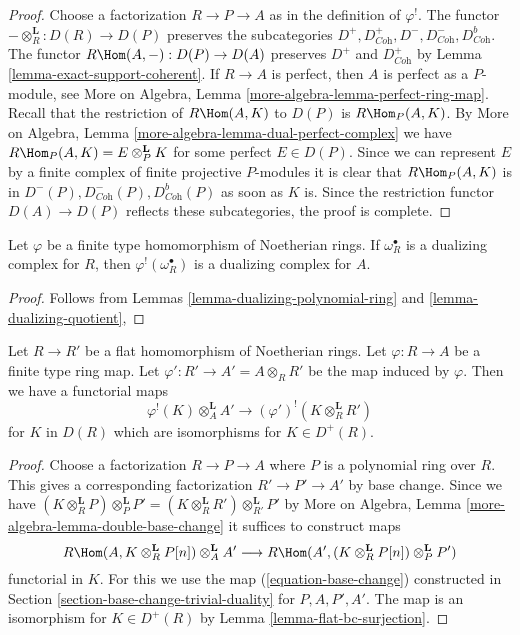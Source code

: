 \begin{proof}
Choose a factorization $R \to P \to A$ as in the definition of $\varphi^!$.
The functor $- \otimes_R^\mathbf{L} : D(R) \to D(P)$ preserves
the subcategories
$D^+, D^+_{\textit{Coh}}, D^-, D^-_{\textit{Coh}}, D^b_{\textit{Coh}}$.
The functor $R\Hom(A, -) : D(P) \to D(A)$
preserves $D^+$ and $D^+_{\textit{Coh}}$ by
Lemma \ref{lemma-exact-support-coherent}.
If $R \to A$ is perfect, then $A$ is perfect as a $P$-module, see
More on Algebra, Lemma \ref{more-algebra-lemma-perfect-ring-map}.
Recall that the restriction of $R\Hom(A, K)$ to $D(P)$ is
$R\Hom_P(A, K)$. By More on Algebra, Lemma
\ref{more-algebra-lemma-dual-perfect-complex}
we have $R\Hom_P(A, K) = E \otimes_P^\mathbf{L} K$ for
some perfect $E \in D(P)$. Since we can represent $E$ by
a finite complex of finite projective $P$-modules
it is clear that $R\Hom_P(A, K)$ is in
$D^-(P), D^-_{\textit{Coh}}(P), D^b_{\textit{Coh}}(P)$
as soon as $K$ is. Since the restriction functor
$D(A) \to D(P)$ reflects these subcategories, the
proof is complete.
\end{proof}

\begin{lemma}
\label{lemma-shriek-dualizing-algebraic}
Let $\varphi$ be a finite type homomorphism of Noetherian rings.
If $\omega_R^\bullet$ is a dualizing complex for $R$, then
$\varphi^!(\omega_R^\bullet)$ is a dualizing complex for $A$.
\end{lemma}

\begin{proof}
Follows from Lemmas
\ref{lemma-dualizing-polynomial-ring} and
\ref{lemma-dualizing-quotient},
\end{proof}

\begin{lemma}
\label{lemma-flat-bc}
Let $R \to R'$ be a flat homomorphism of Noetherian rings.
Let $\varphi : R \to A$ be a finite type ring map.
Let $\varphi' : R' \to A' = A \otimes_R R'$ be the map induced by $\varphi$.
Then we have a functorial maps
$$
\varphi^!(K) \otimes_A^\mathbf{L} A' \longrightarrow
(\varphi')^!(K \otimes_R^\mathbf{L} R')
$$
for $K$ in $D(R)$ which are isomorphisms for $K \in D^+(R)$.
\end{lemma}

\begin{proof}
Choose a factorization $R \to P \to A$ where $P$ is a polynomial ring over $R$.
This gives a corresponding factorization $R' \to P' \to A'$ by base change.
Since we have $(K \otimes_R^\mathbf{L} P) \otimes_P^\mathbf{L} P' =
(K \otimes_R^\mathbf{L} R') \otimes_{R'}^\mathbf{L} P'$
by More on Algebra, Lemma \ref{more-algebra-lemma-double-base-change}
it suffices to construct maps
$$
R\Hom(A, K \otimes_R^\mathbf{L} P[n]) \otimes_A^\mathbf{L} A'
\longrightarrow
R\Hom(A', (K \otimes_R^\mathbf{L} P[n]) \otimes_P^\mathbf{L} P')
$$
functorial in $K$. For this we use the map (\ref{equation-base-change})
constructed in Section \ref{section-base-change-trivial-duality}
for $P, A, P', A'$.
The map is an isomorphism for $K \in D^+(R)$ by
Lemma \ref{lemma-flat-bc-surjection}.
\end{proof}

